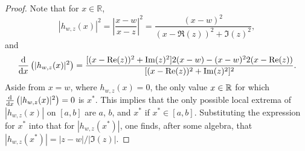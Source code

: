 \begin{proof}
    Note that for $x\in\mathbb{R}$, 
\begin{equation*}
    | h_{w,z} (x) |^2 = \left| \frac{x-w}{x-z} \right|^2 = \frac{(x-w )^2}{( x - \Re(z) )^2 + \Im(z)^2} ,
\end{equation*}
and
\begin{equation*}
    \frac{\textup{d}}{\textup{d}{x}} \left( | h_{w,z} (x) |^2 \right) = \frac{[ (x - \operatorname{Re}(z) )^2 + \operatorname{Im}(z )^2 ]2(x-w) - (x-w )^2 2 ( x - \operatorname{Re}(z) )}{[ (x - \operatorname{Re}(z) )^2 + \operatorname{Im}(z )^2 ]^2} .
\end{equation*}
Aside from \( x=w \), where \( h_{w,z} (x) = 0 \), the only value \( x \in \mathbb{R} \) for which \( \frac{\textup{d}}{\textup{d}{x}} \left( | h_{w,z} (x) |^2 \right) = 0 \) is \( x^* \).
This implies that the only possible local extrema of  \( | h_{w,z} (x)|  \) on \( [a,b] \) are  \( a \), \( b \), and \( x^* \) if \( x^* \in [a,b] \).
Substituting the expression for \( x^{*} \) into that for \( | h_{w,z} ( x^{*} ) | \), one finds, after some algebra, that \( | h_{w,z} ( x^{*} ) | = | z-w | / | \Im (z) | \).

\end{proof}

